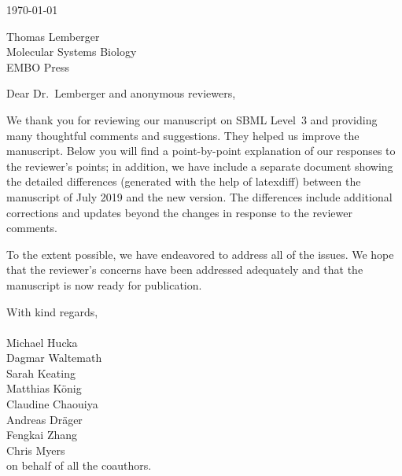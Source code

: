 \documentclass[11pt]{mhletter}
\begin{document}
\thispagestyle{empty}


\vspace*{4em}

\hspace{4.1in}\today

\vspace*{1em}

\begin{flushleft}
Thomas Lemberger\\
Molecular Systems Biology\\
EMBO Press
\end{flushleft}

\vspace*{1em}

\setlength{\parskip}{0.7em}

Dear Dr.\ Lemberger and anonymous reviewers,

We thank you for reviewing our manuscript on SBML Level~3 and providing many thoughtful comments and suggestions.  They helped us improve the manuscript.  Below you will find a point-by-point explanation of our responses to the reviewer's points; in addition, we have include a separate document showing the detailed differences (generated with the help of latexdiff) between the manuscript of July 2019 and the new version.  The differences include additional corrections and updates beyond the changes in response to the reviewer comments.

To the extent possible, we have endeavored to address all of the issues.  We hope that the reviewer's concerns have been addressed adequately and that the manuscript is now ready for publication.


\vspace*{1em}
\hspace{4in}
\begin{minipage}{3in}
With kind regards,\\
\\[1ex]
Michael Hucka\\
Dagmar Waltemath\\
Sarah Keating\\
Matthias K\"{o}nig\\
Claudine Chaouiya\\
Andreas Dr\"{a}ger\\
Fengkai Zhang\\
Chris Myers\\
on behalf of all the coauthors.
\end{minipage}
\end{document}
